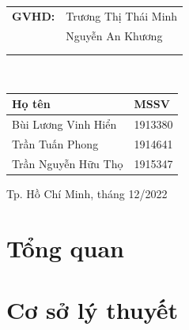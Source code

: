 \documentclass[a4paper]{report}
\theoremstyle{definition}
\begin{document}
\begin{titlepage}



	\begin{center}
		\begin{tabular}{m{1.5 cm}m{5.5cm}}
			\textbf{GVHD:} & Trương Thị Thái Minh \\
			& Nguyễn An Khương \\
			\\ \\
		\end{tabular}\\
		\begin{tabular}{m{5cm}m{2cm}}
			\hline
			\textbf{Họ tên}     & \textbf{MSSV} \\
			\hline
			Bùi Lương Vinh Hiển & 1913380       \\
			Trần Tuấn Phong     & 1914641       \\
			Trần Nguyễn Hữu Thọ & 1915347       \\
		\end{tabular}
	\end{center}


	\vspace{1.5cm}
	\begin{center}
		{\footnotesize Tp. Hồ Chí Minh, tháng 12/2022}
	\end{center}
\end{titlepage}

\newpage
\tableofcontents


\chapter{Tổng quan}
% 


\chapter{Cơ sở lý thuyết}


\end{document}
